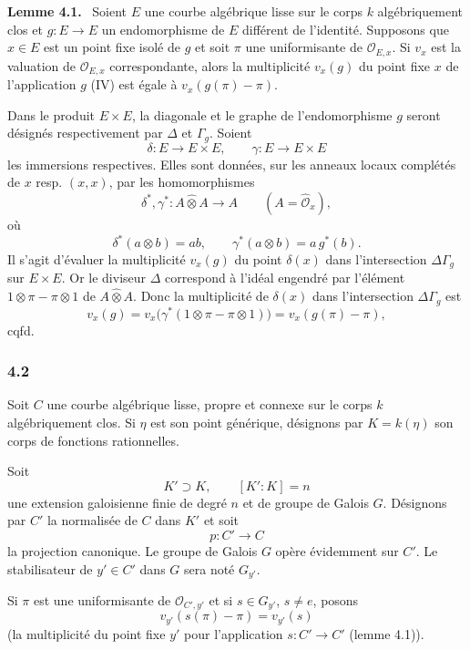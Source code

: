 \documentclass[11pt]{article}
\newenvironment{statement}[1]{\par\medskip\noindent\textbf{#1.}\ }{\par\medskip}
\begin{document}
\begin{statement}{Lemme 4.1}
Soient $E$ une courbe algébrique lisse sur le corps $k$ algébriquement clos et $g:E\to E$ un endomorphisme de $E$ différent de l'identité. Supposons que $x\in E$ est un point fixe isolé de $g$ et soit $\pi$ une uniformisante de $\mathcal O_{E,x}$. Si $v_x$ est la valuation de $\mathcal O_{E,x}$ correspondante, alors la multiplicité $v_x(g)$ du point fixe $x$ de l'application $g$ (IV) est égale à $v_x(g(\pi)-\pi)$.
\end{statement}


Dans le produit $E\times E$, la diagonale et le graphe de l'endomorphisme $g$ seront désignés respectivement par $\Delta$ et $\Gamma_g$. Soient
\[
\delta:E\longrightarrow E\times E,\qquad
\gamma:E\longrightarrow E\times E
\]
les immersions respectives. Elles sont données, sur les anneaux locaux complétés de $x$ resp. $(x,x)$, par les homomorphismes
\[
\delta^*,\gamma^*:A\widehat\otimes A\longrightarrow A
\qquad (A=\widehat{\mathcal O}_x),
\]
où
\[
\delta^*(a\otimes b)=ab,\qquad
\gamma^*(a\otimes b)=a\,g^*(b).
\]
Il s'agit d'évaluer la multiplicité $v_x(g)$ du point $\delta(x)$ dans l'intersection $\Delta\Gamma_g$ sur $E\times E$. Or le diviseur $\Delta$ correspond à l'idéal engendré par l'élément $1\otimes\pi-\pi\otimes1$ de $A\widehat\otimes A$. Donc la multiplicité de $\delta(x)$ dans l'intersection $\Delta\Gamma_g$ est
\[
v_x(g)=v_x\bigl(\gamma^*(1\otimes\pi-\pi\otimes1)\bigr)
      =v_x(g(\pi)-\pi),
\]
cqfd.

\subsubsection*{4.2}

Soit $C$ une courbe algébrique lisse, propre et connexe sur le corps $k$ algébriquement clos. Si $\eta$ est son point générique, désignons par $K=k(\eta)$ son corps de fonctions rationnelles.

Soit
\[
K'\supset K,\qquad [K':K]=n
\]
une extension galoisienne finie de degré $n$ et de groupe de Galois $G$. Désignons par $C'$ la normalisée de $C$ dans $K'$ et soit
\[
p:C'\longrightarrow C
\]
la projection canonique. Le groupe de Galois $G$ opère évidemment sur $C'$. Le stabilisateur de $y'\in C'$ dans $G$ sera noté $G_{y'}$.

Si $\pi$ est une uniformisante de $\mathcal O_{C',y'}$ et si $s\in G_{y'}$, $s\ne e$, posons
\[
v_{y'}(s(\pi)-\pi)=v_{y'}(s)
\tag{4.2.1}
\]
(la multiplicité du point fixe $y'$ pour l'application $s:C'\to C'$ (lemme 4.1)).%
\end{document}
